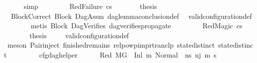 \begin{isabellebody}
\ \ \ \ \isamarkupfalse%
\ simp\isanewline
\ \ \isamarkupfalse%
\isanewline
\ \ \ \ \isamarkupfalse%
\ {\isacharparenleft}{\kern0pt}RedFailure\ cs{\isacharparenright}{\kern0pt}\isanewline
\ \ \ \ \isamarkupfalse%
\ \isamarkupfalse%
\ {\isacharquery}{\kern0pt}thesis\ \isamarkupfalse%
\ \ BlockCorrect\ Block\ DagAssm\ dag{\isacharunderscore}{\kern0pt}lemma{\isacharunderscore}{\kern0pt}conclusion{\isacharunderscore}{\kern0pt}def\ \isamarkupfalse%
\ valid{\isacharunderscore}{\kern0pt}configuration{\isacharunderscore}{\kern0pt}def\isanewline
\ \ \ \ \ \ \isamarkupfalse%
\ {\isacharparenleft}{\kern0pt}metis\ Block{}\ DagVerifies\ dag{\isacharunderscore}{\kern0pt}verifies{\isacharunderscore}{\kern0pt}propagate{\isacharunderscore}{\kern0pt}{}{\isacharparenright}{\kern0pt}\isanewline
\ \ \isamarkupfalse%
\isanewline
\ \ \ \ \isamarkupfalse%
\ {\isacharparenleft}{\kern0pt}RedMagic\ cs{\isacharparenright}{\kern0pt}\isanewline
\ \ \ \ \isamarkupfalse%
\ \isamarkupfalse%
\ {\isacharquery}{\kern0pt}thesis\ \isamarkupfalse%
\ {}\ \isamarkupfalse%
\ valid{\isacharunderscore}{\kern0pt}configuration{\isacharunderscore}{\kern0pt}def\isanewline
\ \ \ \ \ \ \isamarkupfalse%
\ {\isacharparenleft}{\kern0pt}meson\ Pair{\isacharunderscore}{\kern0pt}inject\ finished{\isacharunderscore}{\kern0pt}remains\ relpowp{\isacharunderscore}{\kern0pt}imp{\isacharunderscore}{\kern0pt}rtranclp\ state{\isachardot}{\kern0pt}distinct{\isacharparenleft}{\kern0pt}{}{\isacharparenright}{\kern0pt}\ state{\isachardot}{\kern0pt}distinct{\isacharparenleft}{\kern0pt}{}{\isacharparenright}{\kern0pt}{\isacharparenright}{\kern0pt}\ \ \ \ \ \isanewline
\ \ \isamarkupfalse%
\isanewline
{}\isamarkupfalse%
%
\endisatagproof
{\isafoldproof}%
%
\isadelimproof
\isanewline
%
\endisadelimproof
\isanewline
{}\isamarkupfalse%
\ cfg{\isacharunderscore}{\kern0pt}dag{\isacharunderscore}{\kern0pt}helper{\isacharunderscore}{\kern0pt}{}{\isacharcolon}{\kern0pt}\isanewline
\ \ \isanewline
\ \ \ Red{\isacharcolon}{\kern0pt}\ {\isachardoublequoteopen}M{\isacharcomma}{\kern0pt}{\isasymLambda}{\isacharcomma}{\kern0pt}{\isasymGamma}{\isacharcomma}{\kern0pt}{\isasymOmega}{\isacharcomma}{\kern0pt}G{}\ {\isasymturnstile}\ {\isacharparenleft}{\kern0pt}Inl\ m{}{\isacharcomma}{\kern0pt}\ {\isacharparenleft}{\kern0pt}Normal\ \ ns{}{\isacharparenright}{\kern0pt}{\isacharparenright}{\kern0pt}\ {\isacharminus}{\kern0pt}n{\isasymrightarrow}{\isacharcircum}{\kern0pt}j\ {\isacharparenleft}{\kern0pt}m{\isacharprime}{\kern0pt}{\isacharcomma}{\kern0pt}\ s{\isacharprime}{\kern0pt}{\isacharparenright}{\kern0pt}{\isachardoublequoteclose}\ \isanewline

\end{isabellebody}
